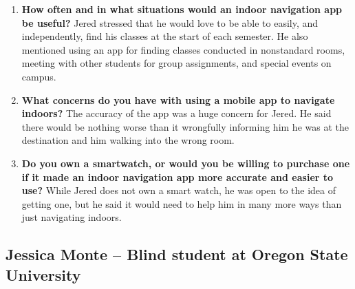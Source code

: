 \documentclass{scrreprt}
\begin{document}
\begin{enumerate}
\item \textbf{How often and in what situations would an indoor navigation app be useful?}
Jered stressed that he would love to be able to easily, and independently, find his classes at the start of each semester. He also mentioned using an app for finding classes conducted in nonstandard rooms, meeting with other students for group assignments, and special events on campus.
 
\item \textbf{What concerns do you have with using a mobile app to navigate indoors?}
The accuracy of the app was a huge concern for Jered. He said there would be nothing worse than it wrongfully informing him he was at the destination and him walking into the wrong room.
 
\item \textbf{Do you own a smartwatch, or would you be willing to purchase one if it made an indoor navigation app more accurate and easier to use?}
While Jered does not own a smart watch, he was open to the idea of getting one, but he said it would need to help him in many more ways than just navigating indoors.
\end{enumerate}

\pagebreak

\subsection{Jessica Monte – Blind student at Oregon State University}
 
\end{document}
